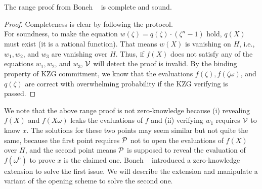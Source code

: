 \begin{lemma}
\label{lemma:range}
The range proof from Boneh \etal~\cite{rangeproof} is complete and sound.
\end{lemma}

\begin{proof}
Completeness is clear by following the protocol. \\
For soundness, to make the equation $w(\zeta)=q(\zeta)\cdot(\zeta^n-1)$ hold, $q(X)$ must exist (it is a rational function). That means $w(X)$ is vanishing on $H$, i.e., $w_1,w_2$, and $w_3$ are vanishing over $H$. Thus, if $f(X)$ does not satisfy any of the equations $w_1,w_2$, and $w_3$, $\mathcal{V}$ will detect the proof is invalid. By the binding property of KZG commitment, we know that the evaluations $f(\zeta),f(\zeta\omega)$, and $q(\zeta)$ are correct with overwhelming probability if the KZG verifying is passed.
\end{proof}
We note that the above range proof is not zero-knowledge because (i) revealing $f(X)$ and $f(X\omega)$ leaks the evaluations of $f$ and (ii) verifying $w_1$ requires $\mathcal{V}$ to know $x$. The solutions for these two points may seem similar but not quite the same, because the first point requires $\mathcal{P}$ not to open the evaluations of $f(X)$ over $H$, and the second point means $\mathcal{P}$ is supposed to reveal the evaluation of $f(\omega^0)$ to prove $x$ is the claimed one. Boneh \etal~\cite{rangeproof} introduced a zero-knowledge extension to solve the first issue. We will describe the extension and manipulate a variant of the opening scheme to solve the second one.

